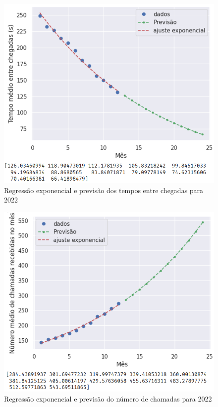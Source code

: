 \begin{figure}[H]
    \centering
    \includegraphics[scale=1]{simulacao/regressao-expo-2022.png}
    \caption{Regressão exponencial e previsão dos tempos entre chegadas para 2022}
    \label{fig: regressao-expo-2022}
\end{figure}

\begin{figure}[H]
    \centering
    \includegraphics[scale=1]{simulacao/previsao-demanda.png}
    \caption{Regressão exponencial e previsão do número de chamadas para 2022}
    \label{fig: previsao-demanda-2022}
\end{figure}